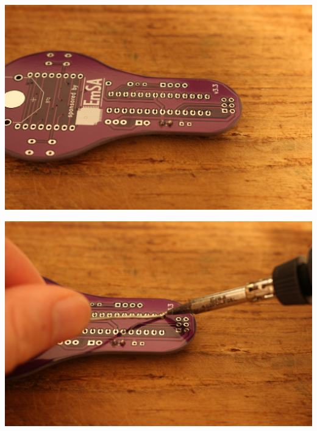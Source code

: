\documentclass{article}
\begin{document}
\vspace{0.5cm}

\begin{minipage}[b]{0.5\textwidth}
	\includegraphics[width=\textwidth]{Bilder2024/IMG_0042.JPG}
\end{minipage}
\begin{minipage}[b]{0.5\textwidth}
	\includegraphics[width=\textwidth]{Bilder2024/IMG_0044.JPG}
\end{minipage}

\vspace{0.5cm}
\end{document}
